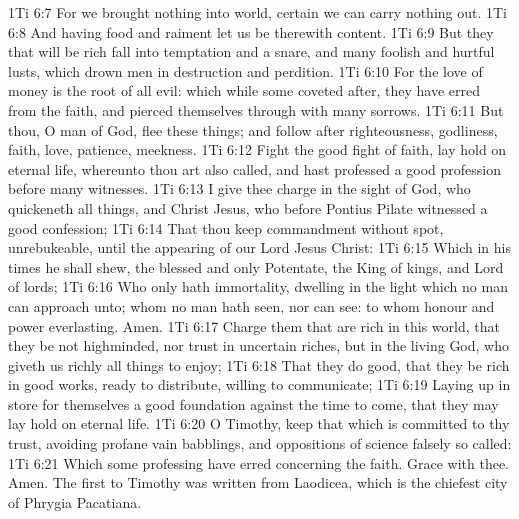 \vs 1Ti 6:7 For we brought nothing into  world,  certain we can carry nothing out.
\vs 1Ti 6:8 And having food and raiment let us be therewith content.
\vs 1Ti 6:9 But they that will be rich fall into temptation and a snare, and  many foolish and hurtful lusts, which drown men in destruction and perdition.
\vs 1Ti 6:10 For the love of money is the root of all evil: which while some coveted after, they have erred from the faith, and pierced themselves through with many sorrows.
\vs 1Ti 6:11 But thou, O man of God, flee these things; and follow after righteousness, godliness, faith, love, patience, meekness.
\vs 1Ti 6:12 Fight the good fight of faith, lay hold on eternal life, whereunto thou art also called, and hast professed a good profession before many witnesses.
\vs 1Ti 6:13 I give thee charge in the sight of God, who quickeneth all things, and  Christ Jesus, who before Pontius Pilate witnessed a good confession;
\vs 1Ti 6:14 That thou keep  commandment without spot, unrebukeable, until the appearing of our Lord Jesus Christ:
\vs 1Ti 6:15 Which in his times he shall shew,  the blessed and only Potentate, the King of kings, and Lord of lords;
\vs 1Ti 6:16 Who only hath immortality, dwelling in the light which no man can approach unto; whom no man hath seen, nor can see: to whom  honour and power everlasting. Amen.
\vs 1Ti 6:17 Charge them that are rich in this world, that they be not highminded, nor trust in uncertain riches, but in the living God, who giveth us richly all things to enjoy;
\vs 1Ti 6:18 That they do good, that they be rich in good works, ready to distribute, willing to communicate;
\vs 1Ti 6:19 Laying up in store for themselves a good foundation against the time to come, that they may lay hold on eternal life.
\vs 1Ti 6:20 O Timothy, keep that which is committed to thy trust, avoiding profane  vain babblings, and oppositions of science falsely so called:
\vs 1Ti 6:21 Which some professing have erred concerning the faith. Grace  with thee. Amen. The first to Timothy was written from Laodicea, which is the chiefest city of Phrygia Pacatiana.
